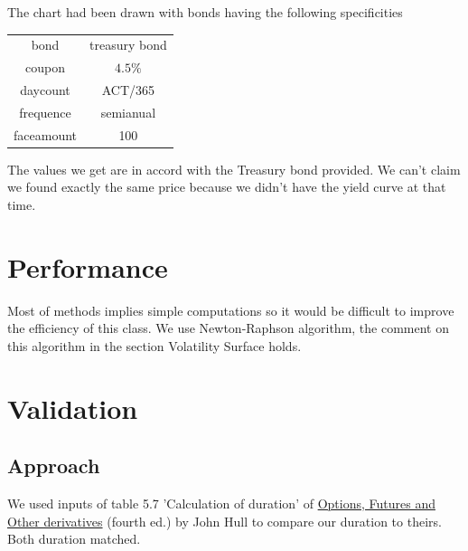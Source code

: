 The chart had been drawn with bonds having the following specificities
\begin{center}
\begin{tabular}{|c|c|}
\hline
bond & treasury bond\\
coupon & $4.5 \%$ \\
daycount & ACT/365\\
frequence &  semianual\\
faceamount & 100 \\
\hline
\end{tabular}
\end{center}
The values we get are in accord with the Treasury bond provided. We can't claim we found exactly the same price because we didn't have the yield curve at that time.


\section{Performance}
Most of methods implies simple computations so it would be difficult to improve the efficiency of this class. We use Newton-Raphson algorithm, the comment on this algorithm in the section Volatility Surface holds.


\section{Validation}
\subsection{Approach}

We used inputs of table 5.7 'Calculation of duration' of \underline{Options, Futures and Other derivatives} (fourth ed.) by John Hull to compare our duration to theirs. Both duration matched.





